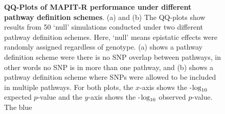\documentclass[10pt]{article}
\def\log{{\rm log}}
\begin{document}

\begin{figure}[htbp]
\centering
{}
\caption{\textbf{QQ-Plots of MAPIT-R performance under different pathway definition schemes}. (a) and (b) The QQ-plots show results from 50 `null' simulations conducted under two different pathway definition schemes. Here, `null' means epistatic effects were randomly assigned regardless of genotype. (a) shows a pathway definition scheme were there is no SNP overlap between pathways, in other words no SNP is in more than one pathway, and (b) shows a pathway definition scheme where SNPs were allowed to be included in multiple pathways. For both plots, the $x$-axis shows the -$\log_{10}$ expected $p$-value and the $y$-axis shows the -$\log_{10}$ observed $p$-value. The blue 
}
\label{InterPath-Supp-Figure-Greg-Simulations-part2}
\end{figure}
\clearpage
\end{document}
